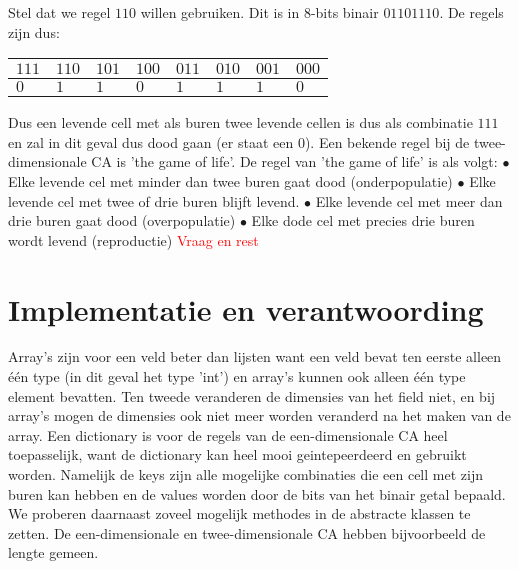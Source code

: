 \documentclass[12pt,a4paper]{article}
\begin{document}
Stel dat we regel $110$ willen gebruiken. Dit is in 8-bits binair $01101110$.
De regels zijn dus:
\begin{center}
\begin{tabular}{|m{0.6cm}|m{0.6cm}|m{0.6cm}|m{0.6cm}|m{0.6cm}|m{0.6cm}|m{0.6cm}|m{0.6cm}|}
    \hline
    $111$ & $110$ & $101$ & $100$ & $011$ & $010$ & $001$ & $000$ \\
    \hline
    $0$ & $1$ & $1$ & $0$ & $1$ & $1$ & $1$ & $0$ \\
    \hline
\end{tabular}
\end{center}
\vspace{10pt}
Dus een levende cell met als buren twee levende cellen is dus als combinatie $111$ en zal in dit geval dus dood gaan (er staat een $0$).
Een bekende regel bij de twee-dimensionale CA is 'the game of life'. 
\newline
De regel van 'the game of life' is als volgt:
\vspace{4pt}
\newline
$\bullet$ Elke levende cel met minder dan twee buren gaat dood (onderpopulatie) 
\newline 
$\bullet$ Elke levende cel met twee of drie buren blijft levend.
\newline
$\bullet$ Elke levende cel met meer dan drie buren gaat dood (overpopulatie)
\newline 
$\bullet$ Elke dode cel met precies drie buren wordt levend (reproductie) 
\newline
\vspace{8pt}
\textcolor{red}{Vraag en rest}


\section*{Implementatie en verantwoording}
Array's zijn voor een veld beter dan lijsten want een veld bevat ten eerste alleen één type (in dit geval het type 'int') 
en array's kunnen ook alleen één type element bevatten.  
Ten tweede veranderen de dimensies van het field niet, en bij array's mogen de dimensies ook niet meer worden veranderd na
het maken van de array. Een dictionary is voor de regels van de een-dimensionale CA heel toepasselijk, want 
de dictionary kan heel mooi geintepeerdeerd en gebruikt worden. 
Namelijk de keys zijn alle mogelijke combinaties die een cell met zijn buren kan hebben
en de values worden door de bits van het binair getal bepaald. 
We proberen daarnaast zoveel mogelijk methodes in de abstracte klassen te zetten.
De een-dimensionale en twee-dimensionale CA hebben bijvoorbeeld de lengte gemeen.   
\end{document}
